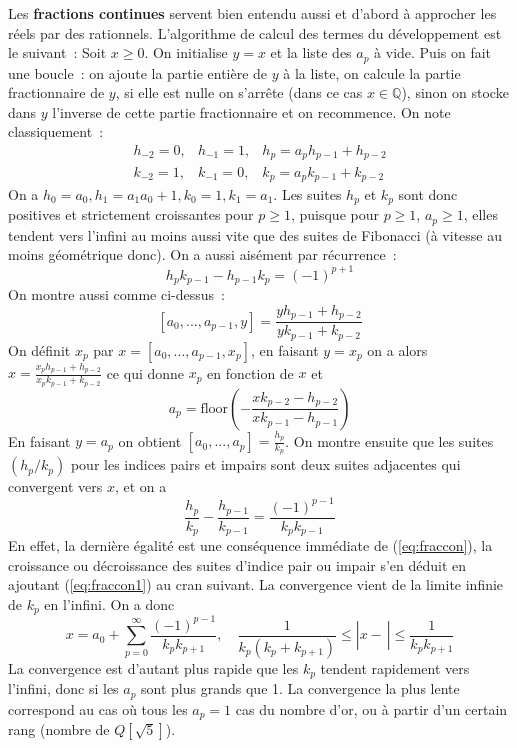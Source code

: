\documentclass[a4paper,11pt]{article}
\newcommand{\Q}{{\mathbb{Q}}}
\begin{document}
\begin{giacjshere}
Les {\bf fractions continues} 
 servent bien entendu aussi et d'abord \`a approcher les
r\'eels par des rationnels.
L'algorithme de calcul des termes du d\'eveloppement est le suivant~:
Soit $x\geq0$. On initialise $y=x$ et la liste des $a_p$ \`a vide. 
Puis on fait une boucle~: on ajoute la partie enti\`ere de $y$ \`a la
liste, on calcule la partie fractionnaire de $y$, si elle est nulle on
s'arr\^ete (dans ce cas $x\in \Q$),
sinon on stocke dans $y$ l'inverse de cette partie fractionnaire et on recommence.
On note classiquement~:
\begin{eqnarray} h_{-2}=0, & h_{-1}=1, & h_p=a_p h_{p-1}+h_{p-2}\\
k_{-2}=1, & k_{-1}=0, & k_p=a_p k_{p-1}+k_{p-2}
\end{eqnarray}
On a $h_0=a_0, h_1=a_1 a_0+1, k_0=1, k_1=a_1$.
Les suites $h_p$ et $k_p$ sont donc positives et strictement croissantes pour $p
\geq 1$, puisque pour $p \geq 1$, $a_p\geq 1$, elles tendent vers
l'infini au moins aussi vite que des suites de Fibonacci (\`a vitesse
au moins g\'eom\'etrique donc).
On a aussi ais\'ement par r\'ecurrence~:
\begin{equation} \label{eq:fraccon}
 h_p k_{p-1} - h_{p-1}k_p=(-1)^{p+1}
\end{equation}
On montre aussi comme ci-dessus~:
$$ [a_0,...,a_{p-1},y]=\frac{yh_{p-1}+h_{p-2}}{yk_{p-1}+k_{p-2}}$$
On d\'efinit $x_p$ par $x=[a_0,...,a_{p-1},x_p]$, en faisant $y=x_p$
on a alors $x=\frac{x_ph_{p-1}+h_{p-2}}{x_p k_{p-1}+k_{p-2}}$ ce qui
donne $x_p$ en fonction de $x$ et
$$ a_p=\mbox{floor}\left( - \frac{xk_{p-2}-h_{p-2}}{xk_{p-1}-h_{p-1}} \right)$$
En faisant $y=a_p$ on obtient $[a_0,...,a_p]=\frac{h_p}{k_p}$.
On montre ensuite que les suites $(h_p/k_p)$ pour les indices pairs et impairs sont deux
suites adjacentes qui convergent vers $x$, et on a
\begin{equation} \label{eq:fraccon1}
\frac{h_p}{k_p} - \frac{h_{p-1}}{k_{p-1}} = \frac{(-1)^{p-1}}{k_p
  k_{p-1}}
\end{equation}
En effet, la derni\`ere \'egalit\'e est une cons\'equence imm\'ediate
de (\ref{eq:fraccon}), la croissance ou d\'ecroissance des suites
d'indice pair ou impair s'en d\'eduit en ajoutant (\ref{eq:fraccon1}) au cran
suivant. La convergence vient de la
limite infinie de $k_p$ en l'infini.
On a donc
$$ x=a_0+\sum_{p=0}^\infty \frac{(-1)^{p-1}}{k_p k_{p+1}}, 
\quad \frac{1}{k_p(k_p+k_{p+1})} \leq |x-\frac{}{}| \leq \frac{1}{k_p
  k_{p+1}}$$
La convergence est d'autant plus rapide que les $k_p$ tendent
rapidement vers l'infini, donc si les $a_p$ sont plus grands que 1.
La convergence la plus lente correspond au cas o\`u tous les $a_p=1$
cas du nombre d'or, ou \`a partir d'un certain rang (nombre de $Q[\sqrt{5}]$).


\end{giacjshere}
\end{document}
